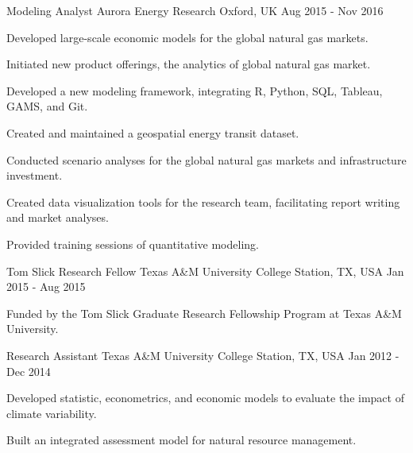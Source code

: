 \begin{cventries}
    \cventry
    {Modeling Analyst} %
    {Aurora Energy Research} %
    {Oxford, UK} %
    {Aug 2015 - Nov 2016} %
    {
        \begin{cvitems} %
            \item {Developed large-scale economic models for the global natural gas markets.}
            \item {Initiated new product offerings, the analytics of global natural gas market.}
            \item {Developed a new modeling framework, integrating R, Python, SQL, Tableau, GAMS, and Git.}
            \item {Created and maintained a geospatial energy transit dataset.}
            \item {Conducted scenario analyses for the global natural gas markets and infrastructure investment.}
            \item {Created data visualization tools for the research team, facilitating report writing and market analyses.}
            \item {Provided training sessions of quantitative modeling.}
        \end{cvitems}
    }

    \cventry
    {Tom Slick Research Fellow} %
    {Texas A\&M University} %
    {College Station, TX, USA} %
    {Jan 2015 - Aug 2015} %
    {
        \begin{cvitems} %
            \item {Funded by the Tom Slick Graduate Research Fellowship Program at Texas A\&M University.}
        \end{cvitems}
    }

    \cventry
    {Research Assistant} %
    {Texas A\&M University} %
    {College Station, TX, USA} %
    {Jan 2012 - Dec 2014} %
    {
        \begin{cvitems} %
            \item {Developed statistic, econometrics, and economic models to evaluate the impact of climate variability.}
            \item {Built an integrated assessment model for natural resource management.}
        \end{cvitems}
    }


\end{cventries}
